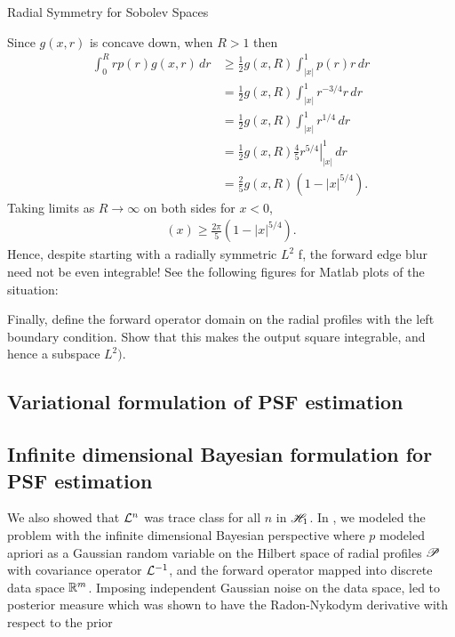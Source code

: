 \begin{chapter}{Radial Symmetry for Sobolev Spaces}

Since $g(x,r)$ is concave down, when $R>1$ then 
\begin{align}
  \int_0^R r p(r)g(x,r)\,dr
    &\ge \frac 12 g(x,R)\int_{|x|}^1  p(r)r\,dr \\
    &= \frac 12 g(x,R)\int_{|x|}^1 r^{-3/4}r\,dr \\
    &= \frac 12 g(x,R)\int_{|x|}^1 r^{1/4}\,dr \\
    &= \frac 12 g(x,R)\left. \frac 45r^{5/4}\right|_{|x|}^1\,dr \\
    &=\frac 25 g(x,R)(1 - |x|^{5/4}).
\end{align}
Taking limits as $R\to\infty$ on both sides for $x<0$,
\begin{align}
[\mathcal G p](x) \ge \frac{2\pi}5 (1 - |x|^{5/4}).
\end{align}
Hence, despite starting with a radially symmetric $L^2$ f, the forward edge blur need not be even integrable!
See the following figures for Matlab plots of the situation:

\begin{com}
  Finally, define the forward operator domain on the radial profiles with the left boundary condition.
  Show that this makes the output square integrable, and hence a subspace $L^2)$.
\end{com}

\subsection{Variational formulation of PSF estimation}
\subsection{Infinite dimensional Bayesian formulation for PSF estimation} \label{sec:infiniteBayesian}

We also showed that $\mathcal L^n$ was trace class for all $n$ in $\mathscr H_1$. %
In , we modeled the problem with the infinite dimensional Bayesian perspective where $p$ modeled apriori as a Gaussian random variable on the Hilbert space of radial profiles $\mathscr P$ with covariance operator $\mathcal L^{-1}$, and the forward operator mapped into discrete data space $\mathbb R^m$. 
Imposing independent Gaussian noise on the data space, led to posterior measure which was shown to have the Radon-Nykodym derivative with respect to the prior


\end{chapter}
